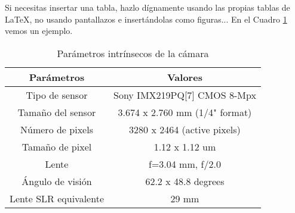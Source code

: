 Si necesitas insertar una tabla, hazlo dígnamente usando las propias tablas de \LaTeX, no usando pantallazos e insertándolas como figuras... En el Cuadro \ref{cuadro:ejemplo} vemos un ejemplo.

\begin{table}[H]
\begin{center}
\begin{tabular}{|c|c|}
\hline
\textbf{Parámetros} & \textbf{Valores} \\
\hline
Tipo de sensor & Sony IMX219PQ[7] CMOS 8-Mpx \\
Tamaño del sensor & 3.674 x 2.760 mm (1/4" format) \\
Número de pixels & 3280 x 2464 (active pixels) \\
Tamaño de pixel & 1.12 x 1.12 um \\
Lente & f=3.04 mm, f/2.0 \\
Ángulo de visión & 62.2 x 48.8 degrees \\
Lente SLR equivalente & 29 mm \\
\hline
\end{tabular}
\caption{Parámetros intrínsecos de la cámara}
\label{cuadro:ejemplo}
\end{center}
\end{table}

